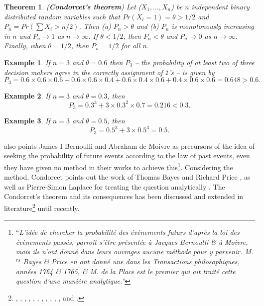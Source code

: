 \documentclass[a4paper]{exam}
\theoremstyle{plain}
\newtheorem{theorem}{Theorem}
\newtheorem{example}{Example}
\begin{document}
\newpage
\begin{theorem} (\textbf{Condorcet's theorem}) Let ($X_1, \ldots, X_n$) be $n$ independent binary distributed random variables such that $Pr(X_i = 1) = \theta > 1/2$ and $P_n = Pr(\sum X_i > n/2)$. Then (a) $P_n > \theta$ and (b) $P_n$ is monotonously increasing in $n$ and $P_n \longrightarrow 1$ as $n \longrightarrow \infty$. If $\theta < 1/2$, then $P_n < \theta$ and $P_n \longrightarrow 0$ as $n \longrightarrow \infty$. Finally, when $\theta = 1/2$, then $P_n = 1/2$ for all $n$.
\end{theorem}

\begin{example} If $n = 3$ and $\theta=0.6$ then $P_{3}$ -- the probability of at least two of three decision makers agree in the correctly assignment of \texttt{1}'s -- is given by \[P_{3} = 0.6 \times 0.6 \times 0.6 + 0.6 \times 0.6 \times 0.4 + 0.6 \times 0.4 \times 0.6 + 0.4 \times 0.6 \times 0.6 = 0.648 > 0.6.\]
\end{example}
\smiley

\begin{example} If $n = 3$ and $\theta=0.3$, then \[P_{3} = 0.3^3 + 3 \times 0.3^2 \times 0.7 = 0.216 < 0.3.\]
\end{example}
\smiley

\begin{example} If $n = 3$ and $\theta=0.5$, then \[P_{3} = 0.5^3 + 3 \times 0.5^3 = 0.5.\]
\end{example}
\smiley

\cite{condorcet1785essay} also points James I Bernoulli and Abraham de Moivre as precursors of the idea of seeking the probability of future events according to the law of past events, even they have given no method in their works to achieve this\footnote{ ``\textit{L'idée de chercher la probabilité des évènements futurs d'après la loi des évènements passés, parroît s'être présentée à Jacques Bernoulli \& à Moivre, mais ils n'ont donné dans leurs ouvrages aucune méthode pour y parvenir. M.$^{rs}$ Bayes \& Price en ont donné une dans les Transactions philosophiques, années 1764 \& 1765, \& M. de la Place est le premier qui ait traité cette question d'une maniére analytique.''}}. Considering the method, Condorcet points out the work of Thomas Bayes and Richard Price \cite{bayes1763essay}, as well as Pierre-Simon Laplace for treating the question analytically \cite{laplace1774memoire}. The Condorcet's theorem and its consequences has been discussed and extended in literature\footnote{ \cite{grofman1983thirteen}, \cite{boland1989majority}, \cite{ladha1992condorcet}, \cite{berg1993condorcet}, \cite{berg1996condorcet}, \cite{austen1996information}, \cite{list2001epistemic}, \cite{williams2004condorcet}, \cite{gehrlein2006condorcet}, \cite{gehrlein2011voting}, \cite{kaniovski2011optimal}, \cite{zaigraev2012note} and \cite{gottlieb2015voting}.} until recently.
\end{document}
